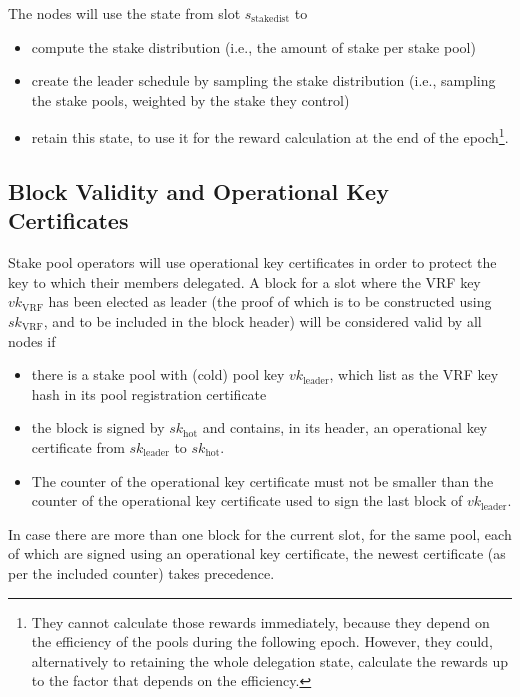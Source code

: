 \documentclass[11pt,a4paper,dvipsnames,twosided]{article}
\begin{document}
The nodes will use the state from slot \(s_\text{stakedist}\) to
\begin{itemize}
\item compute the stake distribution (i.e., the amount of stake per
  stake pool)
\item create the leader schedule by sampling the stake distribution
  (i.e., sampling the stake pools, weighted by the stake they control)
\item retain this state, to use it for the reward calculation at the
  end of the epoch\footnote{They cannot calculate those rewards
    immediately, because they depend on the efficiency of the pools
    during the following epoch. However, they could, alternatively to
    retaining the whole delegation state, calculate the rewards up to
    the factor that depends on the efficiency.}.
\end{itemize}

\subsection{Block Validity and Operational Key Certificates}
\label{block-validity-and-operational-key-certificates}

Stake pool operators will use operational key certificates in order to protect
the key to which their members delegated. A block for a slot where the VRF key
\(vk_\text{VRF}\) has been elected as leader (the proof of which is to be
constructed using \(sk_\text{VRF}\), and to be included in the block header)
will be considered valid by all nodes if

\begin{itemize}
\item there is a stake pool with (cold) pool key \(vk_\text{leader}\), which
  list  as the VRF key hash in its pool registration
  certificate

\item
  the block is signed by \(sk_\text{hot}\) and contains, in its header, an
  operational key certificate from
  \(sk_\text{leader}\) to \(sk_\text{hot}\).

\item
  The counter of the operational key certificate must not be smaller than the
  counter of the operational key certificate used to sign the last block of
  \(vk_\text{leader}\).
\end{itemize}

In case there are more than one block for the current slot, for the same pool,
each of which are signed using an operational key certificate, the newest
certificate (as per the included counter) takes precedence.
\end{document}
